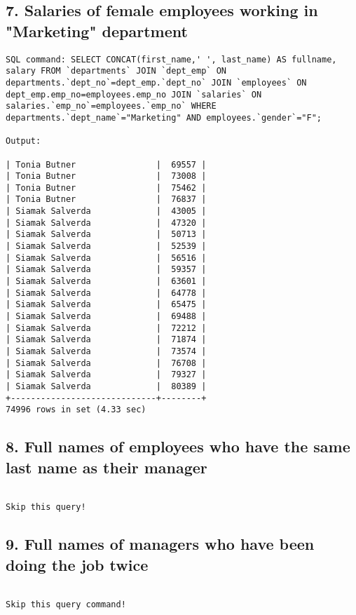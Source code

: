 \documentclass{report}
\begin{document}
\subsection*{7. Salaries of female employees working in "Marketing" department}
\begin{lstlisting}
SQL command: SELECT CONCAT(first_name,' ', last_name) AS fullname, salary FROM `departments` JOIN `dept_emp` ON departments.`dept_no`=dept_emp.`dept_no` JOIN `employees` ON dept_emp.emp_no=employees.emp_no JOIN `salaries` ON salaries.`emp_no`=employees.`emp_no` WHERE departments.`dept_name`="Marketing" AND employees.`gender`="F";

Output:

| Tonia Butner                |  69557 |
| Tonia Butner                |  73008 |
| Tonia Butner                |  75462 |
| Tonia Butner                |  76837 |
| Siamak Salverda             |  43005 |
| Siamak Salverda             |  47320 |
| Siamak Salverda             |  50713 |
| Siamak Salverda             |  52539 |
| Siamak Salverda             |  56516 |
| Siamak Salverda             |  59357 |
| Siamak Salverda             |  63601 |
| Siamak Salverda             |  64778 |
| Siamak Salverda             |  65475 |
| Siamak Salverda             |  69488 |
| Siamak Salverda             |  72212 |
| Siamak Salverda             |  71874 |
| Siamak Salverda             |  73574 |
| Siamak Salverda             |  76708 |
| Siamak Salverda             |  79327 |
| Siamak Salverda             |  80389 |
+-----------------------------+--------+
74996 rows in set (4.33 sec)

\end{lstlisting}

\subsection*{8. Full names of employees who have the same last name as their manager}
\begin{lstlisting}

Skip this query!

\end{lstlisting}

\subsection*{9. Full names of managers who have been doing the job twice}
\begin{lstlisting}

Skip this query command!

\end{lstlisting}
\end{document}
